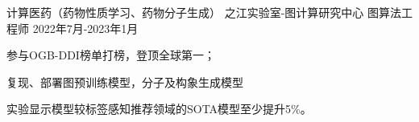 \begin{cventries}
  \cventry
  {计算医药（药物性质学习、药物分子生成）} %
  {之江实验室-图计算研究中心} %
  {图算法工程师} %
  {2022年7月-2023年1月} %
  {
    \begin{cvitems} %
      \item {参与OGB-DDI榜单打榜，登顶全球第一；}
      \item {复现、部署图预训练模型，分子及构象生成模型}
      \item {实验显示模型较标签感知推荐领域的SOTA模型至少提升5\%。}
    \end{cvitems}
  }
\end{cventries}